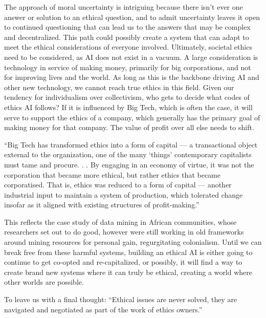 \documentclass{svproc}
\begin{document}
The approach of moral uncertainty is intriguing because there isn't ever one answer or solution to an ethical question, and to admit uncertainty leaves it open to continued questioning  that can lead us to the answers that may be complex and decentralized. This path could possibly create a system that can adapt to meet the ethical considerations of everyone involved. \cite{Wallach2008MachineFaculties} Ultimately, societal ethics need to be considered, as AI does not exist in a vacuum. A large consideration is technology in service of making money, primarily for big corporations, and not for improving lives and the world. As long as this is the backbone driving AI and other new technology, we cannot reach true ethics in this field. Given our tendency for individualism over collectivism, who gets to decide what codes of ethics AI follows? If it is influenced by Big Tech, which is often the case, it will serve to support the ethics of a company, which generally has the primary goal of making money for that company. The value of profit over all else needs to shift. 

\begin{displayquote}
“Big Tech has transformed ethics into a form of capital — a transactional object external to the organization, one of the many ‘things’ contemporary capitalists must tame and procure. . . By engaging in an economy of virtue, it was not the corporation that became more ethical, but rather ethics that became corporatised. That is, ethics was reduced to a form of capital — another industrial input to maintain a system of production, which tolerated change insofar as it aligned with existing structures of profit-making.” \cite{Phan2021EconomiesTech}
\end{displayquote}

This reflects the case study of data mining in African communities, whose researchers set out to do good, however were still working in old frameworks around mining resources for personal gain, regurgitating colonialism. Until we can break free from these harmful systems, building an ethical AI is either going to continue to get co-opted and re-capitalized, or possibly, it will find a way to create brand new systems where it can truly be ethical, creating a world where other worlds are possible.

 To leave us with a final thought:  “Ethical issues are never solved, they are navigated and negotiated as part of the work of ethics owners.” \cite{Moss2019TheCompanies.}
\end{document}
